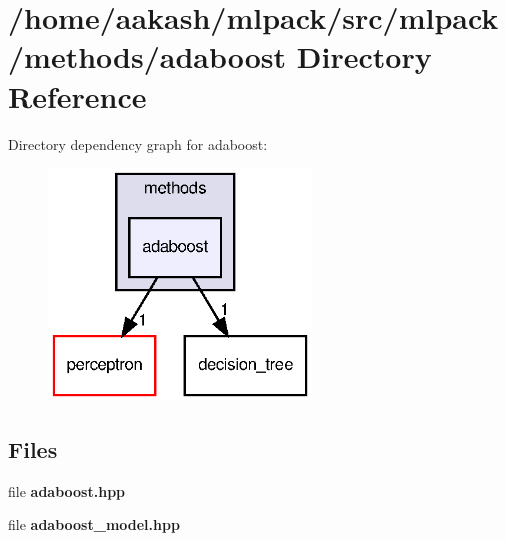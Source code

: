 \section{/home/aakash/mlpack/src/mlpack/methods/adaboost Directory Reference}
\label{dir_23df8455679e8ad547d712804f6863e9}
Directory dependency graph for adaboost\+:
\nopagebreak
\begin{figure}[H]
\begin{center}
\leavevmode
\includegraphics[width=198pt]{dir_23df8455679e8ad547d712804f6863e9_dep}
\end{center}
\end{figure}
\subsection*{Files}
\begin{DoxyCompactItemize}
\item 
file \textbf{ adaboost.\+hpp}
\item 
file \textbf{ adaboost\+\_\+model.\+hpp}
\end{DoxyCompactItemize}
